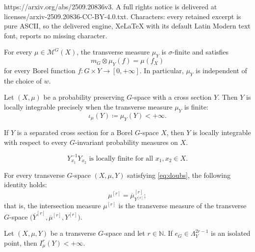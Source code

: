 \documentclass[10pt,a4paper]{amsart}
\begin{document}
https://arxiv.org/abs/2509.20836v3. A full rights notice is delivered at licenses/arxiv-2509.20836-CC-BY-4.0.txt. Characters: every retained excerpt is pure ASCII, so the delivered engine, XeLaTeX with its default Latin Modern text font, reports no missing character.
\begin{prop}\label{prop:campbell}
For every \(\mu\in\mathcal{M}^{G}\left(X\right)\), the transverse measure \(\mu_{Y}\) is \(\sigma\)-finite and satisfies
\[m_{G}\otimes\mu_{Y}\left(f\right)=\mu\left(f_{X}\right)\]
for every Borel function \(f:G\times Y\to\left[0,+\infty\right]\). In particular, \(\mu_{Y}\) is independent of the choice of \(w\).
\end{prop}

\begin{prop}\label{prop:intensityli}
Let \(\left(X,\mu\right)\) be a probability preserving \(G\)-space with a cross section \(Y\). Then \(Y\) is locally integrable precisely when the transverse measure \(\mu_{Y}\) is finite:
\[\iota_{\mu}\left(Y\right)\coloneqq \mu_{Y}\left(Y\right)<+\infty.\]
\end{prop}

\begin{lem}\label{lem:separatedli}
If \(Y\) is a separated cross section for a Borel \(G\)-space \(X\), then \(Y\) is locally integrable with respect to every \(G\)-invariant probability measures on \(X\).
\end{lem}

\begin{equation}\label{eq:doubs}\tag{\(\bigstar\)}
Y_{x_{1}}^{-1}Y_{x_{2}}\text{ is locally finite for all }x_{1},x_{2}\in X.
\end{equation}

\begin{prop}\label{prop:intmeasiden}
For every transverse \(G\)-space \(\left(X,\mu,Y\right)\) satisfying \eqref{eq:doubs}, the following identity holds:
\[\mu^{\left[r\right]}=\overline{\mu}_{Y^{\left[r\right]}}^{\left[r\right]};\]
that is, the intersection measure \(\mu^{\left[r\right]}\) is the transverse measure of the transverse \(G\)-space \(\big(\overline{Y}^{\left[r\right]},\overline{\mu}^{\left[r\right]},Y^{\left[r\right]}\big)\).
\end{prop}

\begin{thm}\label{thm:finiteiv}
Let \(\left(X,\mu,Y\right)\) be a transverse \(G\)-space and let \(r\in\mathbb{N}\). If \(e_{G}\in\Lambda_{Y}^{2r-1}\) is an isolated point, then \(I_{\mu}^{r}\left(Y\right)<+\infty\).
\end{thm}
\end{document}
